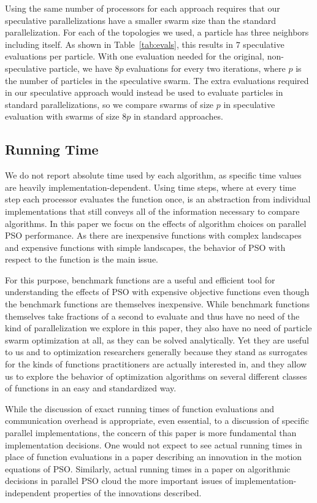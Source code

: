 \documentclass[smallcondensed]{svjour3}
\begin{document}
Using the same number of processors for each approach requires that our
speculative parallelizations have a smaller swarm size than the standard
parallelization.  For each of the topologies we used, a particle has three
neighbors including itself.  As shown in Table~\ref{tab:evals}, this results in
$7$ speculative evaluations per particle.  With one evaluation needed for the
original, non-speculative particle, we have $8p$ evaluations for every two
iterations, where $p$ is the number of particles in the speculative swarm.  The
extra evaluations required in our speculative approach would instead be used to
evaluate particles in standard parallelizations, so we compare swarms of size
$p$ in speculative evaluation with swarms of size $8p$ in standard approaches.

\subsection{Running Time}

We do not report absolute time used by each algorithm, as specific time values
are heavily implementation-dependent.  Using time steps, where at every time
step each processor evaluates the function once, is an abstraction from
individual implementations that still conveys all of the information necessary
to compare algorithms.  In this paper we focus on the effects of algorithm
choices on parallel PSO performance.  As there are inexpensive functions with
complex landscapes and expensive functions with simple landscapes, the behavior
of PSO with respect to the function is the main issue.

For this purpose, benchmark functions are a useful and efficient tool for
understanding the effects of PSO with expensive objective functions even though
the benchmark functions are themselves inexpensive.  While benchmark functions
themselves take fractions of a second to evaluate and thus have no need of the
kind of parallelization we explore in this paper, they also have no need of
particle swarm optimization at all, as they can be solved analytically.  Yet
they are useful to us and to optimization researchers generally because they
stand as surrogates for the kinds of functions practitioners are actually
interested in, and they allow us to explore the behavior of optimization
algorithms on several different classes of functions in an easy and
standardized way.

While the discussion of exact running times of function evaluations and
communication overhead is appropriate, even essential, to a discussion of
specific parallel implementations, the concern of this paper is more
fundamental than implementation decisions.  One would not expect to see actual
running times in place of function evaluations in a paper describing an
innovation in the motion equations of PSO.  Similarly, actual running times in
a paper on algorithmic decisions in parallel PSO cloud the more important
issues of implementation-independent properties of the innovations described.
\end{document}
